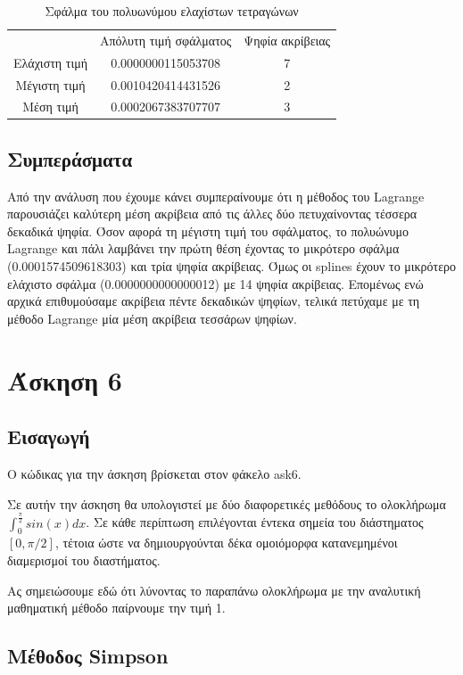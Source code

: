 \documentclass[a4paper,11pt]{article}
\newcommand{\lt}{\latintext}
\newcommand{\gt}{\greektext}
\begin{document}
\begin{table}[ht]
\centering
\begin{tabular}{c c c}
   \gt & Απόλυτη τιμή σφάλματος & Ψηφία ακρίβειας \\
   Ελάχιστη τιμή & 0.0000000115053708 & 7 \\
   Μέγιστη τιμή & 0.0010420414431526 & 2 \\
   Μέση τιμή & 0.0002067383707707 & 3 \\
\end{tabular}
\caption{\gt Σφάλμα του πολυωνύμου ελαχίστων τετραγώνων}
\label{fig:table5c}
\end{table}

\subsection{Συμπεράσματα}

Από την ανάλυση που έχουμε κάνει συμπεραίνουμε ότι η μέθοδος του \lt Lagrange \gt παρουσιάζει καλύτερη μέση ακρίβεια από τις άλλες δύο πετυχαίνοντας τέσσερα δεκαδικά ψηφία. Όσον αφορά τη μέγιστη τιμή του σφάλματος, το πολυώνυμο \lt Lagrange \gt και πάλι λαμβάνει την πρώτη θέση έχοντας το μικρότερο σφάλμα (0.0001574509618303) και τρία ψηφία ακρίβειας. Όμως οι \lt splines \gt έχουν το μικρότερο ελάχιστο σφάλμα (0.0000000000000012) με 14 ψηφία ακρίβειας. Επομένως ενώ αρχικά επιθυμούσαμε ακρίβεια πέντε δεκαδικών ψηφίων, τελικά πετύχαμε με τη μέθοδο \lt Lagrange \gt μία μέση ακρίβεια τεσσάρων ψηφίων.

\section{Άσκηση 6}
\subsection{Εισαγωγή}

\gt Ο κώδικας για την άσκηση βρίσκεται στον φάκελο \lt ask6.

\gt Σε αυτήν την άσκηση θα υπολογιστεί με δύο διαφορετικές μεθόδους το ολοκλήρωμα $\int_0^{\frac{\pi}{2}}sin(x)dx$. Σε κάθε περίπτωση επιλέγονται έντεκα σημεία του διάστηματος $[0, \pi/2]$, τέτοια ώστε να δημιουργούνται δέκα ομοιόμορφα κατανεμημένοι διαμερισμοί του διαστήματος. 

Ας σημειώσουμε εδώ ότι λύνοντας το παραπάνω ολοκλήρωμα με την αναλυτική μαθηματική μέθοδο παίρνουμε την τιμή 1.

\subsection{Μέθοδος \lt Simpson}
\end{document}
